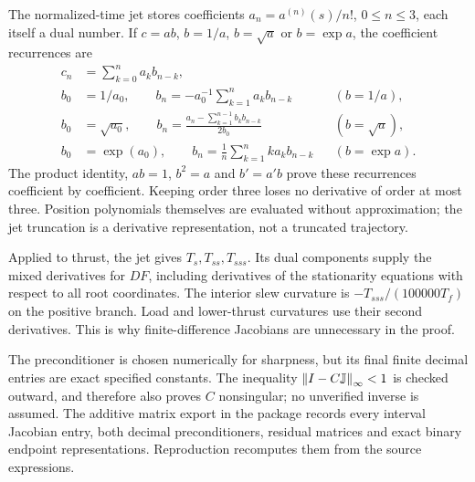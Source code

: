 The normalized-time jet stores coefficients $a_n=a^{(n)}(s)/n!$, $0\leq n\leq3$, each itself a dual number. If $c=ab$, $b=1/a$, $b=\sqrt a$ or $b=\exp a$, the coefficient recurrences are
\begin{align*}
 c_n&=\sum_{k=0}^na_kb_{n-k},\\
 b_0&=1/a_0,\qquad
 b_n=-a_0^{-1}\sum_{k=1}^na_kb_{n-k} &&(b=1/a),\\
 b_0&=\sqrt{a_0},\qquad
 b_n=\frac{a_n-\sum_{k=1}^{n-1}b_kb_{n-k}}{2b_0} &&(b=\sqrt a),\\
 b_0&=\exp(a_0),\qquad
 b_n=\frac1n\sum_{k=1}^n k a_kb_{n-k} &&(b=\exp a).
\end{align*}
The product identity, $ab=1$, $b^2=a$ and $b'=a'b$ prove these recurrences coefficient by coefficient. Keeping order three loses no derivative of order at most three. Position polynomials themselves are evaluated without approximation; the jet truncation is a derivative representation, not a truncated trajectory.

Applied to thrust, the jet gives $T_s,T_{ss},T_{sss}$. Its dual components supply the mixed derivatives for $DF$, including derivatives of the stationarity equations with respect to all root coordinates. The interior slew curvature is $-T_{sss}/(100000T_f)$ on the positive branch. Load and lower-thrust curvatures use their second derivatives. This is why finite-difference Jacobians are unnecessary in the proof.

The preconditioner is chosen numerically for sharpness, but its final finite decimal entries are exact specified constants. The inequality $\left\lVert I-C\mathbb J\right\rVert_\infty<1$ is checked outward, and therefore also proves $C$ nonsingular; no unverified inverse is assumed. The additive matrix export in the package records every interval Jacobian entry, both decimal preconditioners, residual matrices and exact binary endpoint representations. Reproduction recomputes them from the source expressions.

